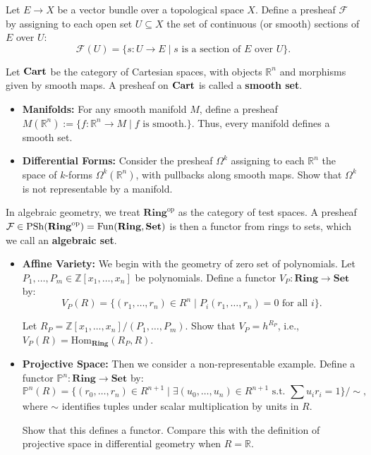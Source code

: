 \begin{example}
Let $E \to X$ be a vector bundle over a topological space $X$. Define a presheaf $\mathcal{F}$ by assigning to each open set $U \subseteq X$ the set of continuous (or smooth) sections of $E$ over $U$:
\[
\mathcal{F}(U) = \{ s : U \to E \mid s \text{ is a section of } E \text{ over } U \}.
\]
\end{example}

\begin{example}
Let $\mathbf{Cart}$ be the category of Cartesian spaces, with objects $\mathbb{R}^n$ and morphisms given by smooth maps. A presheaf on $\mathbf{Cart}$ is called a \textbf{smooth set}.
\begin{itemize}
  \item \textbf{Manifolds:} For any smooth manifold $M$, define a presheaf $M(\mathbb{R}^n) := \{f: \mathbb{R}^n\to M \mid f \text{ is smooth.}\}$. Thus, every manifold defines a smooth set.
    \item \textbf{Differential Forms:} Consider the presheaf $\Omega^k$ assigning to each $\mathbb{R}^n$ the space of $k$-forms $\Omega^k(\mathbb{R}^n)$, with pullbacks along smooth maps. Show that $\Omega^k$ is not representable by a manifold.
\end{itemize}
\end{example}

\begin{example}
In algebraic geometry, we treat $\mathbf{Ring}^{\mathrm{op}}$ as the category of test spaces. A presheaf $\mathcal{F} \in \mathrm{PSh}(\mathbf{Ring}^{\mathrm{op}}) = \mathrm{Fun}(\mathbf{Ring}, \mathbf{Set})$ is then a functor from rings to sets, which we call an \textbf{algebraic set}.
\begin{itemize}
    \item \textbf{Affine Variety:} We begin with the geometry of zero set of polynomials. Let $P_1, \ldots, P_m \in \mathbb{Z}[x_1, \ldots, x_n]$ be polynomials. Define a functor $V_P: \mathbf{Ring} \to \mathbf{Set}$ by:
    \[
    V_P(R) = \{ (r_1, \ldots, r_n) \in R^n \mid P_i(r_1, \ldots, r_n) = 0 \text{ for all } i \}.
    \]
    \begin{exercise}
    Let $R_P = \mathbb{Z}[x_1, \ldots, x_n]/(P_1, \ldots, P_m)$. Show that $V_P = h^{R_P}$, i.e., $V_P(R) = \mathrm{Hom}_{\mathbf{Ring}}(R_P, R)$.
    \end{exercise}

    \item \textbf{Projective Space:} Then we consider a non-representable example. Define a functor $\mathbb{P}^n: \mathbf{Ring} \to \mathbf{Set}$ by:
    \[
    \mathbb{P}^n(R) = \{ (r_0, \ldots, r_n) \in R^{n+1} \mid \exists (u_0, \ldots, u_n) \in R^{n+1} \text{ s.t. } \sum u_i r_i = 1 \}/\sim,
    \]
    where $\sim$ identifies tuples under scalar multiplication by units in $R$.

    \begin{exercise}
    Show that this defines a functor. Compare this with the definition of projective space in differential geometry when $R = \mathbb{R}$.
    \end{exercise}
\end{itemize}
\end{example}

